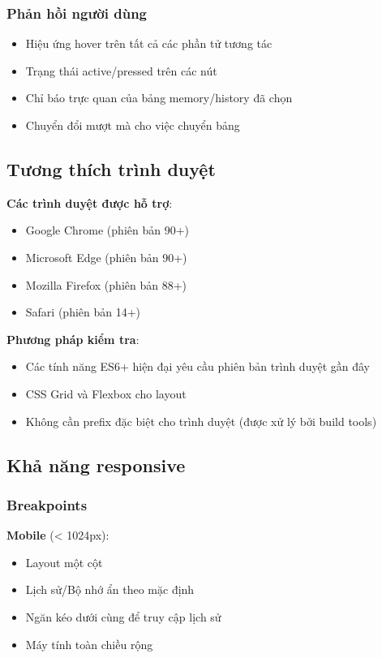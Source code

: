 \subsubsection{Phản hồi người dùng}
\begin{itemize}
    \item Hiệu ứng hover trên tất cả các phần tử tương tác
    \item Trạng thái active/pressed trên các nút
    \item Chỉ báo trực quan của bảng memory/history đã chọn
    \item Chuyển đổi mượt mà cho việc chuyển bảng
\end{itemize}

\subsection{Tương thích trình duyệt}

\textbf{Các trình duyệt được hỗ trợ}:
\begin{itemize}
    \item Google Chrome (phiên bản 90+)
    \item Microsoft Edge (phiên bản 90+)
    \item Mozilla Firefox (phiên bản 88+)
    \item Safari (phiên bản 14+)
\end{itemize}

\textbf{Phương pháp kiểm tra}:
\begin{itemize}
    \item Các tính năng ES6+ hiện đại yêu cầu phiên bản trình duyệt gần đây
    \item CSS Grid và Flexbox cho layout
    \item Không cần prefix đặc biệt cho trình duyệt (được xử lý bởi build tools)
\end{itemize}

\subsection{Khả năng responsive}

\subsubsection{Breakpoints}

\textbf{Mobile} (< 1024px):
\begin{itemize}
    \item Layout một cột
    \item Lịch sử/Bộ nhớ ẩn theo mặc định
    \item Ngăn kéo dưới cùng để truy cập lịch sử
    \item Máy tính toàn chiều rộng
\end{itemize}

